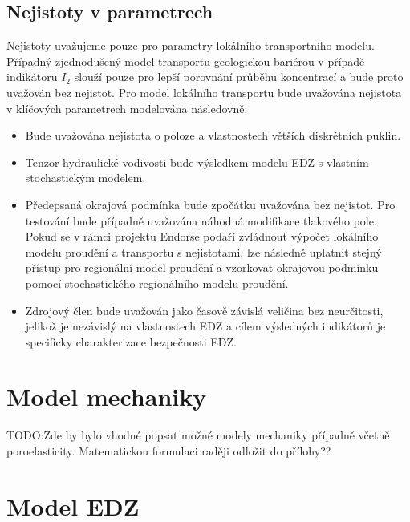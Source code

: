 \documentclass{article}
\def\todo#1{{TODO:\color{red}#1}}
\begin{document}
\subsection{Nejistoty v parametrech}
Nejistoty uvažujeme pouze pro parametry lokálního transportního modelu. Případný zjednodušený model transportu geologickou bariérou v případě indikátoru $I_2$ slouží pouze pro lepší porovnání průběhu koncentrací a bude proto uvažován bez nejistot. Pro model lokálního transportu  bude uvažována nejistota v klíčových parametrech modelována následovně:
\begin{itemize}
 \item Bude uvažována nejistota o poloze a vlastnostech větších diskrétních puklin.
 \item Tenzor hydraulické vodivosti bude výsledkem modelu EDZ s vlastním stochastickým modelem.
 \item Předepsaná okrajová podmínka bude zpočátku uvažována bez nejistot. Pro testování  bude případně uvažována náhodná modifikace tlakového pole. Pokud se v rámci projektu Endorse podaří zvládnout výpočet lokálního modelu proudění a transportu s nejistotami, lze následně uplatnit stejný přístup pro regionální model proudění a vzorkovat okrajovou podmínku pomocí stochastického regionálního modelu proudění.
 \item Zdrojový člen bude uvažován jako časově závislá veličina bez neurčitosti, jelikož 
 je nezávislý na vlastnostech EDZ a cílem výsledných indikátorů je specificky charakterizace bezpečnosti EDZ.
\end{itemize}

\section{Model mechaniky}
\todo{Zde by bylo vhodné popsat možné modely mechaniky případně včetně poroelasticity}. Matematickou formulaci raději odložit do přílohy??
\section{Model EDZ}
\end{document}
